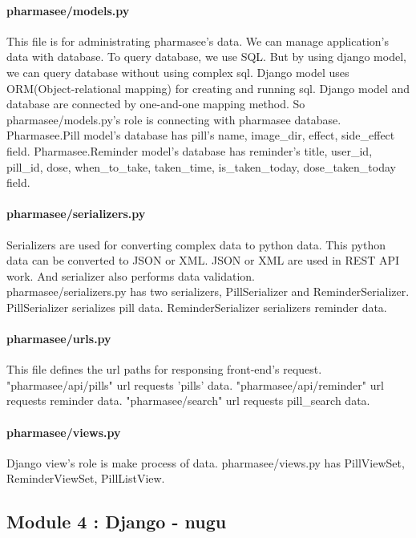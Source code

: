 \documentclass[conference]{IEEEtran}
\begin{document}
\paragraph{pharmasee/models.py}
This file is for administrating pharmasee's data. We can manage application's data with database. To query database, we use SQL. But by using django model, we can query database without using complex sql. Django model uses ORM(Object-relational mapping) for creating and running sql. Django model and database are connected by one-and-one mapping method. So pharmasee/models.py's role is connecting with pharmasee database. Pharmasee.Pill model's database has pill's name, image\_dir, effect, side\_effect field. Pharmasee.Reminder model's database has reminder's title, user\_id, pill\_id, dose, when\_to\_take, taken\_time, is\_taken\_today, dose\_taken\_today field.

\paragraph{pharmasee/serializers.py}
Serializers are used for converting complex data to python data. This python data can be converted to JSON or XML. JSON or XML are used in REST API work. And serializer also performs data validation. \\
pharmasee/serializers.py has two serializers, PillSerializer and ReminderSerializer. PillSerializer serializes pill data. ReminderSerializer serializers reminder data.

\paragraph{pharmasee/urls.py}
This file defines the url paths for responsing front-end's request. "pharmasee/api/pills" url requests 'pills' data. "pharmasee/api/reminder" url requests reminder data. "pharmasee/search" url requests pill\_search data. 

\paragraph{pharmasee/views.py}
Django view's role is make process of data. pharmasee/views.py has PillViewSet, ReminderViewSet, PillListView. 





\subsection{Module 4 : Django - nugu}\\
\end{document}
